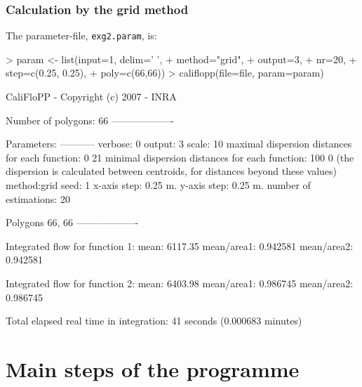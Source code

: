 \documentclass[a4paper,twoside,openright]{report}
\begin{document}
\section{Calculation by the grid method}


The parameter-file, \texttt{exg2.param},  is:
\begin{Schunk}
\begin{Sinput}
> param <- list(input=1, delim=' ', 
+          method="grid", 
+          output=3,
+           nr=20, 
+           step=c(0.25, 0.25),
+          poly=c(66,66))
>  califlopp(file=file, param=param)
\end{Sinput}
\begin{Soutput}
CaliFloPP -  Copyright (c) 2007 - INRA

Number of polygons: 66
-------------------

Parameters:
-----------
verbose: 0
output: 3
scale: 10
maximal dispersion distances for each function: 0 21
minimal dispersion distances for each function: 100 0
(the dispersion is calculated between centroids,
 for distances beyond these values)
method:grid
seed: 1
x-axis step: 0.25 m. 
y-axis step: 0.25 m.
number of estimations: 20

Polygons  66, 66
-------------------

Integrated flow for function 1:
 mean: 6117.35 mean/area1: 0.942581 mean/area2: 0.942581

Integrated flow for function 2:
 mean: 6403.98 mean/area1: 0.986745 mean/area2: 0.986745



Total elapsed real time in integration: 41 seconds (0.000683 minutes)
\end{Soutput}
\end{Schunk}


\part{Main steps of the programme}

\end{document}
